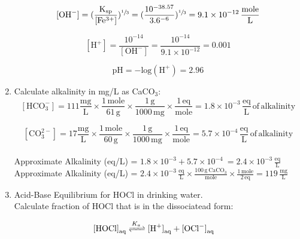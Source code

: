 \documentclass[12pt,letterpaper]{article}
\begin{document}
\begin{enumerate}
\begin{equation*}
\mathrm{[OH^-] = (\frac{K_{sp}}{[Fe^{3+}]})^{\sfrac{1}{3}} = (\frac{10^{-38.57}}{3.6\time 10^{-6}})^{\sfrac{1}{3}} = 9.1\times 10^{-12}\, \frac{mole}{L}} 
\end{equation*}

\begin{equation*}
\mathrm{[H^+] = \frac{10^{-14}}{[OH^-]} = \frac{10^{-14}}{9.1\times 10^{-12}} = 0.001}
\end{equation*}

\begin{equation*}
\mathrm{pH = -log(H^+) = 2.96}
\end{equation*}

\vspace{0.2in}

\item Calculate alkalinity in mg/L as CaCO$_3$:\\

\begin{equation*}
\mathrm{[HCO_3^{-}] = 111 \frac{mg}{L}\times \frac{1\, mole}{61\, g}\times \frac{1\, g}{1000\, mg}\times \frac{1\, eq}{mole} = 1.8\times 10^{-3}\, \frac{eq}{L}\, of \, alkalinity}
\end{equation*}

\begin{equation*}
\mathrm{[CO_3^{2-}] = 17 \frac{mg}{L}\times \frac{1\, mole}{60\, g}\times \frac{1\, g}{1000\, mg}\times \frac{1\, eq}{mole} = 5.7\times 10^{-4}\, \frac{eq}{L}\, of \, alkalinity}
\end{equation*}\\

Approximate Alkalinity (eq/L) = $\mathrm{1.8\times 10^{-3} + 5.7\times 10^{-4}\ = 2.4\times 10^{-3}\, \frac{eq}{L}}$\\

Approximate Alkalinity (eq/L) = $\mathrm{2.4\times 10^{-3}\, \frac{eq}{L} \times \frac{100\, g\, CaCO_3}{mole}\times \frac{1\, mole}{2\, eq} = 119\, \frac{mg}{L}}$\\

\vspace{0.2in}

\item Acid-Base Equilibrium for HOCl in drinking water.\\
Calculate fraction of HOCl that is in the dissociatead form:

\begin{align*}
\cee{[HOCl]_{aq} &<=>[K_{a}] [H^{+}]_{aq} + [OCl^{-}]_{aq}} 
\end{align*}\\


\end{enumerate}
\end{document}
